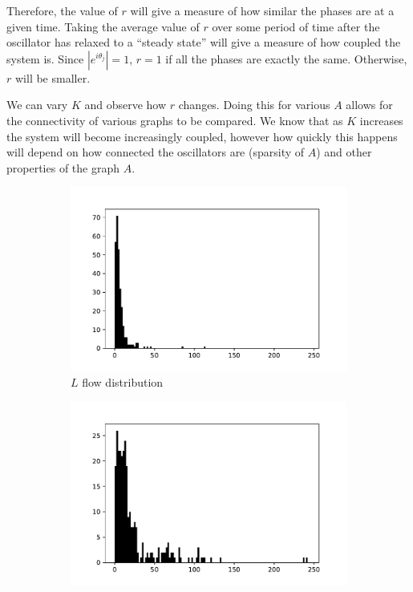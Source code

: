 \documentclass[10pt]{article}
\begin{document}
Therefore, the value of \( r \) will give a measure of how similar the phases are at a given time. Taking the average value of \( r \) over some period of time after the oscillator has relaxed to a ``steady state'' will give a measure of how coupled the system is. Since \( |e^{i\theta_j}| = 1 \), \( r = 1 \) if all the phases are exactly the same. Otherwise, \( r \) will be smaller.

We can vary \( K \) and observe how \( r \) changes. Doing this for various \( A \) allows for the connectivity of various graphs to be compared. We know that as \( K \) increases the system will become increasingly coupled, however how quickly this happens will depend on how connected the oscillators are (sparsity of \( A \)) and other properties of the graph \( A \).

\begin{figure}[t]\centering
\begin{subfigure}{.3\textwidth}\centering
    \includegraphics[width=\textwidth]{img/L_flow.pdf}
    \caption{\(L\) flow distribution}
\end{subfigure}\hfill
\begin{subfigure}{.3\textwidth}\centering
    \includegraphics[width=\textwidth]{img/Ac_flow_in.pdf}

\end{subfigure}
\end{figure}
\end{document}
